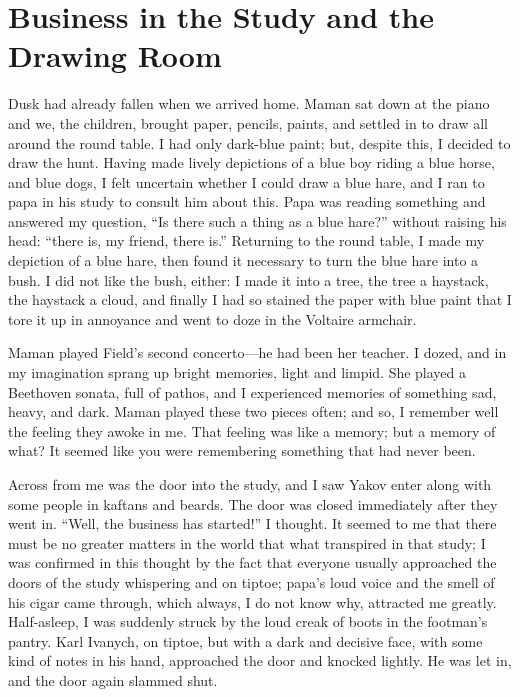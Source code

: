 \chapter{Business in the Study and the Drawing Room} %

Dusk had already fallen when we arrived home. Maman sat down at the piano and we, the children, brought paper, pencils, paints, and settled in to draw all around the round table. I had only dark-blue paint; but, despite this, I decided to draw the hunt. Having made lively depictions of a blue boy riding a blue horse, and blue dogs, I felt uncertain whether I could draw a blue hare, and I ran to papa in his study to consult him about this. Papa was reading something and answered my question, ``Is there such a thing as a blue hare?'' without raising his head: ``there is, my friend, there is.'' Returning to the round table, I made my depiction of a blue hare, then found it necessary to turn the blue hare into a bush. I did not like the bush, either: I made it into a tree, the tree a haystack, the haystack a cloud, and finally I had so stained the paper with blue paint that I tore it up in annoyance and went to doze in the Voltaire armchair.

Maman played Field's second concerto---he had been her teacher. I dozed, and in my imagination sprang up bright memories, light and limpid. She played a Beethoven sonata, full of pathos, and I experienced memories of something sad, heavy, and dark. Maman played these two pieces often; and so, I remember well the feeling they awoke in me. That feeling was like a memory; but a memory of what? It seemed like you were remembering something that had never been.

 Across from me was the door into the study, and I saw Yakov enter along with some people in kaftans and beards. The door was closed immediately after they went in. ``Well, the business has started!'' I thought. It seemed to me that there must be no greater matters in the world that what transpired in that study; I was confirmed in this thought by the fact that everyone usually approached the doors of the study whispering and on tiptoe; papa's loud voice and the smell of his cigar came through, which always, I do not know why, attracted me greatly. Half-asleep, I was suddenly struck by the loud creak of boots in the footman's pantry. Karl Ivanych, on tiptoe, but with a dark and decisive face, with some kind of notes in his hand, approached the door and knocked lightly. He was let in, and the door again slammed shut.


